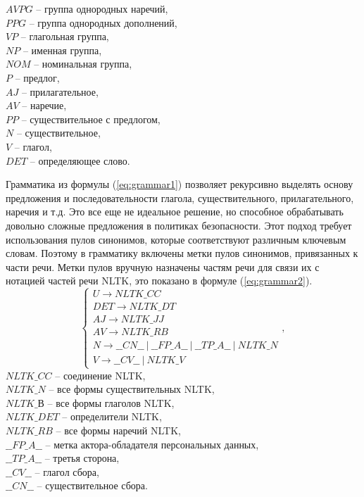 \documentclass[../main]{subfiles}
\begin{document}
\makebox[1.25cm]{}$AVPG$ -- группа однородных наречий,\\
\makebox[1.25cm]{}$PPG$ -- группа однородных дополнений,\\
\makebox[1.25cm]{}$VP$ -- глагольная группа,\\
\makebox[1.25cm]{}$NP$ -- именная группа,\\
\makebox[1.25cm]{}$NOM$ -- номинальная группа,\\
\makebox[1.25cm]{}$P$ -- предлог,\\
\makebox[1.25cm]{}$AJ$ -- прилагательное,\\
\makebox[1.25cm]{}$AV$ -- наречие,\\
\makebox[1.25cm]{}$PP$ -- существительное с предлогом,\\
\makebox[1.25cm]{}$N$ -- существительное,\\
\makebox[1.25cm]{}$V$ -- глагол,\\
\makebox[1.25cm]{}$DET$ -- определяющее слово.

Грамматика из формулы (\ref{eq:grammar1}) позволяет рекурсивно выделять основу предложения и последовательности глагола, существительного, прилагательного, наречия и т.д. Это все еще не идеальное решение, но способное обрабатывать довольно сложные предложения в политиках безопасности. Этот подход требует использования пулов синонимов, которые соответствуют различным ключевым словам. Поэтому в грамматику включены метки пулов синонимов, привязанных к части речи. Метки пулов вручную назначены частям речи для связи их с нотацией частей речи NLTK, это показано в формуле (\ref{eq:grammar2}).
\begin{equation}
    \label{eq:grammar2}
    \left\{ 
        \begin{array}{l}
            U \rightarrow NLTK\_CC \\
            DET \rightarrow NLTK\_DT \\
            AJ \rightarrow NLTK\_JJ \\
            AV \rightarrow NLTK\_RB \\
            N \rightarrow \_\_CN\_\_\ |\ \_\_FP\_A\_\_\ |\ \_\_TP\_A\_\_\ |\ NLTK\_N \\
            V \rightarrow \_\_CV\_\_\ |\ NLTK\_V
        \end{array},
    \right. 
\end{equation}
$NLTK\_CC$ -- соединение NLTK,\\
\makebox[1.25cm]{}$NLTK\_N$ -- все формы существительных NLTK,\\
\makebox[1.25cm]{}$NLTK\_В$ -- все формы глаголов NLTK,\\
\makebox[1.25cm]{}$NLTK\_DET$ -- определители NLTK,\\
\makebox[1.25cm]{}$NLTK\_RB$ -- все формы наречий NLTK,\\
\makebox[1.25cm]{}$\_\_FP\_A\_\_$ -- метка актора-обладателя персональных данных,\\
\makebox[1.25cm]{}$\_\_TP\_A\_\_$ -- третья сторона,\\
\makebox[1.25cm]{}$\_\_CV\_\_$ -- глагол сбора,\\
\makebox[1.25cm]{}$\_\_CN\_\_$ -- существительное сбора.
\end{document}
